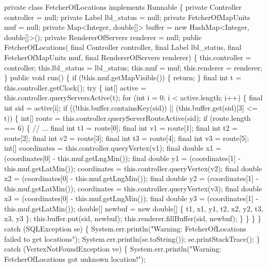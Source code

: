 \nwenddocs{}\plusendmoddef
private class FetcherOfLocations implements Runnable \{
  private Controller controller = null;
  private Label lbl_status = null;
  private FetcherOfMapUnits muf = null;
  private Map<Integer, double[]> buffer = new HashMap<Integer, double[]>();
  private RendererOfServers renderer = null;
  public FetcherOfLocations(
      final Controller controller,
      final Label lbl_status,
      final FetcherOfMapUnits muf,
      final RendererOfServers renderer) \{
    this.controller = controller;
    this.lbl_status = lbl_status;
    this.muf = muf;
    this.renderer = renderer;
  \}
  public void run() \{
    if (!this.muf.getMapVisible()) \{
      return;
    \}
    final int t = this.controller.getClock();
    try \{
      int[] active = this.controller.queryServersActive(t);
      for (int i = 0; i < active.length; i++) \{
        final int sid = active[i];
        if ((!this.buffer.containsKey(sid)) || (this.buffer.get(sid)[3] <= t)) \{
          int[] route = this.controller.queryServerRouteActive(sid);
          if (route.length == 6) \{  // ...
            final int t1 = route[0];
            final int v1 = route[1];
            final int t2 = route[2];
            final int v2 = route[3];
            final int t3 = route[4];
            final int v3 = route[5];
            int[] coordinates = this.controller.queryVertex(v1);
            final double x1 = (coordinates[0] - this.muf.getLngMin());
            final double y1 = (coordinates[1] - this.muf.getLatMin());
            coordinates = this.controller.queryVertex(v2);
            final double x2 = (coordinates[0] - this.muf.getLngMin());
            final double y2 = (coordinates[1] - this.muf.getLatMin());
            coordinates = this.controller.queryVertex(v3);
            final double x3 = (coordinates[0] - this.muf.getLngMin());
            final double y3 = (coordinates[1] - this.muf.getLatMin());
            double[] newbuf = new double[] \{ t1, x1, y1, t2, x2, y2, t3, x3, y3 \};
            this.buffer.put(sid, newbuf);
            this.renderer.fillBuffer(sid, newbuf);
          \}
        \}
      \}
    \} catch (SQLException se) \{
      System.err.println("Warning: FetcherOfLocations failed to get locations");
      System.err.println(se.toString());
      se.printStackTrace();
    \} catch (VertexNotFoundException ve) \{
      System.err.println("Warning: FetcherOfLocations got unknown location!");
